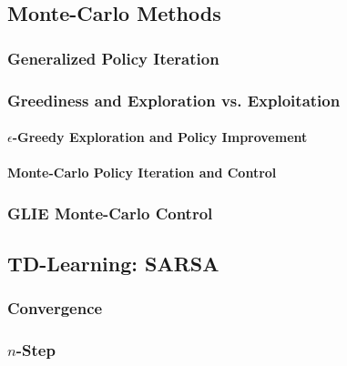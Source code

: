 		\subsection{Monte-Carlo Methods} %

			\subsubsection{Generalized Policy Iteration} %

			\subsubsection{Greediness and Exploration vs. Exploitation} %

				\paragraph{\(\epsilon\)-Greedy Exploration and Policy Improvement} %

				\paragraph{Monte-Carlo Policy Iteration and Control} %

			\subsubsection{GLIE Monte-Carlo Control} %

		\subsection{TD-Learning: SARSA} %

			\subsubsection{Convergence} %

			\subsubsection{\(n\)-Step} %

